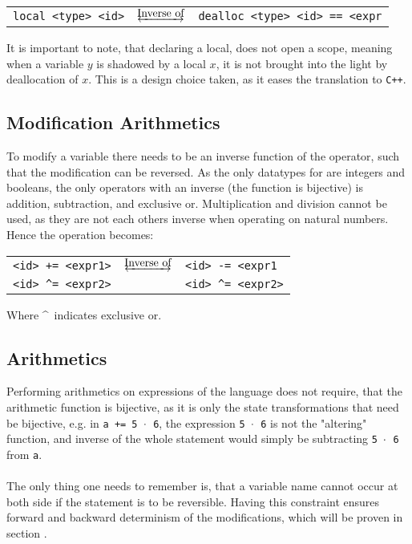 \begin{table*}[h]
    \centering
    \begin{tabular}{lcl}
        \texttt{local <type> <id>}
        & $\underleftrightarrow{\text{Inverse of}}$ &
        \texttt{dealloc <type> <id> == <expr}
    \end{tabular}
\end{table*}
\noindent
It is important to note, that declaring a local, does not open a scope, meaning when a variable
$y$ is shadowed by a local $x$, it is not brought into the light by deallocation of $x$.
This is a design choice taken, as it eases the translation to \texttt{C++}.

\subsection{Modification Arithmetics \rr}
To modify a variable there needs to be an inverse function of the operator, such that the
modification can be reversed. As the only datatypes for \lan are integers and booleans,
the only operators with an inverse (the function is bijective) is addition, subtraction, and
exclusive or. Multiplication and division cannot be used, as they are not each others inverse
when operating on natural numbers. Hence the operation becomes:

\begin{table*}[h]
    \centering
    \begin{tabular}{lcl}
        \texttt{<id> += <expr1>} & $\underleftrightarrow{\text{Inverse of}}$ & \texttt{<id> -= <expr1} \\
        \texttt{<id> \textasciicircum= <expr2>} & & \texttt{<id> \textasciicircum= <expr2>}
    \end{tabular}
\end{table*}
\noindent
Where \textasciicircum ~indicates exclusive or.

\subsection{Arithmetics \rr}
Performing arithmetics on expressions of the language does not require, that the arithmetic function
is bijective, as it is only the state transformations that need be bijective, e.g. in
\texttt{a += 5 $\cdot$ 6}, the expression \texttt{5 $\cdot$ 6} is not the "altering" function, and
inverse of the whole statement would simply be subtracting \texttt{5 $\cdot$ 6} from \texttt{a}.
\\
\\
The only thing one needs to remember is, that a variable name cannot occur at both side if the
statement is to be reversible. Having this constraint ensures forward and backward determinism
of the modifications, which will be proven in section .


